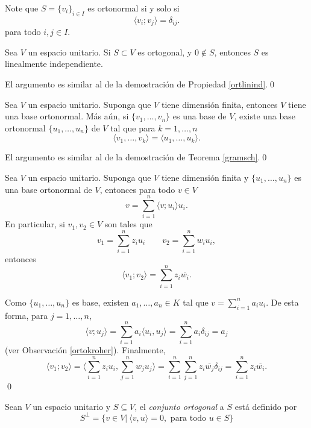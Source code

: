 \begin{obs}\label{ortokroher}
Note que $S=\{v_i\}_{i\in I}$ es ortonormal si y solo si
\[
\langle v_i;v_j\rangle=\delta_{ij}.
\]
para todo $i,j\in I$.
\end{obs}

\begin{pro}
Sea $V$ un espacio unitario. Si $S\subset V$ es ortogonal, y $0\not\in S$, entonces $S$ es linealmente independiente.
\end{pro}

\dem El argumento es similar al de la demostraci\'on de Propiedad \ref{ortlinind}.\qed

\begin{teo}
Sea $V$ un espacio unitario. Suponga que $V$ tiene dimensi\'on finita, entonces $V$ tiene una base ortonormal. M\'as a\'un, si $\{v_1,\ldots,v_n\}$ es una base de $V$, existe una base ortonormal $\{u_1,\ldots,u_n\}$ de $V$ tal que para $k=1,\ldots,n$
\[
\langle v_1,\ldots,v_k\rangle=\langle u_1,\ldots,u_k\rangle.
\]
\end{teo}

\dem El argumento es similar al de la demostraci\'on de Teorema \ref{gramsch}.\qed

\begin{pro}\label{coorortonorher}
Sea $V$ un espacio unitario. Suponga que $V$ tiene dimensi\'on finita y $\{u_1,\ldots,u_n\}$ es una base ortonormal de $V$, entonces para todo $v\in V$
\[
v=\sum_{i=1}^n\langle v;u_i\rangle u_i.
\]
En particular, si $v_1,v_2\in V$ son tales que
\[
v_1=\sum_{i=1}^nz_iu_i\qquad v_2=\sum_{i=1}^nw_iu_i,
\]
entonces
\[
\langle v_1;v_2\rangle=\sum_{i=1}^nz_i\overline{w_i}.
\]
\end{pro}

\dem Como $\{u_1,\ldots,u_n\}$ es base, existen $a_1,\ldots,a_n\in K$ tal que $v=\sum_{i=1}^na_iu_i$. De esta forma, para $j=1,\ldots,n$, 
\[
\langle v;u_j\rangle=\sum_{i=1}^na_i\langle u_i,u_j\rangle=\sum_{i=1}^n a_i\delta_{ij}=a_j
\]
(ver Observaci\'on \ref{ortokroher}). Finalmente,
\[
\langle v_1;v_2\rangle=\langle\sum_{i=1}^nz_iu_i,\sum_{j=1}^nw_ju_j\rangle=\sum_{i=1}^n\sum_{j=1}^nz_i\overline{w_j}\delta_{ij}=\sum_{i=1}^nz_i\overline{w_i}.
\]
\qed

\begin{defn}
Sean $V$ un espacio unitario y $S\subseteq V$, el \emph{conjunto ortogonal} a $S$ est\'a definido por
\[
S^\perp=\{v\in V|\ \langle v,u\rangle=0, \textrm{ para todo } u\in S\}
\]
\end{defn}

